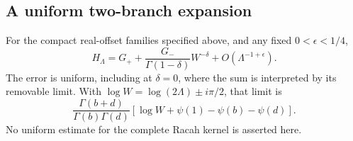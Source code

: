 \subsection{A uniform two-branch expansion}
\begin{proposition}
For the compact real-offset families specified above, and any fixed
$0<\epsilon<1/4$,
\begin{equation}
 H_\Lambda=G_++\frac{G_-}{\Gamma(1-\delta)}W^{-\delta}
                 +O(\Lambda^{-1+\epsilon}).
 \label{eq:endpoint-two-branch}
\end{equation}
The error is uniform, including at $\delta=0$, where the sum is interpreted
by its removable limit. With $\log W=\log(2\Lambda)\pm i\pi/2$, that limit is
\begin{equation}
 \frac{\Gamma(b+d)}{\Gamma(b)\Gamma(d)}
       [\log W+\psi(1)-\psi(b)-\psi(d)].
 \label{eq:endpoint-zero}
\end{equation}
No uniform estimate for the complete Racah kernel is asserted here.
\label{prop:endpoint}
\end{proposition}
